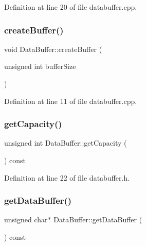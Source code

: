 Definition at line 20 of file databuffer.\+cpp.

\mbox{\label{class_data_buffer_a8b1617a03808b96bc6658e21497fb4d5}} 
\subsubsection{\texorpdfstring{createBuffer()}{createBuffer()}}
{\footnotesize\ttfamily void Data\+Buffer\+::create\+Buffer (\begin{DoxyParamCaption}\item[{unsigned int}]{buffer\+Size }\end{DoxyParamCaption})}



Definition at line 11 of file databuffer.\+cpp.

\mbox{\label{class_data_buffer_a0cf7a4f1fcba3f12053dd08985a08c20}} 
\subsubsection{\texorpdfstring{getCapacity()}{getCapacity()}}
{\footnotesize\ttfamily unsigned int Data\+Buffer\+::get\+Capacity (\begin{DoxyParamCaption}{ }\end{DoxyParamCaption}) const\hspace{0.3cm}{\ttfamily [inline]}}



Definition at line 22 of file databuffer.\+h.

\mbox{\label{class_data_buffer_ade34e6e14e59046a1ed42db1588ed8cb}} 
\subsubsection{\texorpdfstring{getDataBuffer()}{getDataBuffer()}}
{\footnotesize\ttfamily unsigned char$\ast$ Data\+Buffer\+::get\+Data\+Buffer (\begin{DoxyParamCaption}{ }\end{DoxyParamCaption}) const\hspace{0.3cm}{\ttfamily [inline]}}



